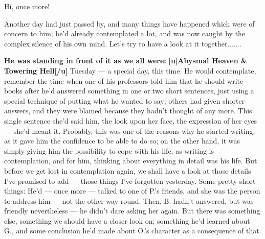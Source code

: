 Hi, once more!

Another day had just passed by, and many things have happened which were of concern to him; he'd already contemplated a lot, and was now caught by the complex silence of his own mind. Let's try to have a look at it together.......

\textbf{He was standing in front of it as we all were:}
\textbf{[u]Abysmal Heaven & Towering Hell[/u]}
Tuesday --- a special day, this time. 
He would contemplate, remember the time when one of his professors told him that he should write books after he'd answered something in one or two short sentences, just using a special technique of putting what he wanted to say; others had given shorter answers, and they were blamed because they hadn't thought of any more. This single sentence she'd said him, the look upon her face, the expression of her eyes --- she'd meant it. 
Probably, this was one of the reasons why he started writing, as it gave him the confidence to be able to do so; on the other hand, it was simply giving him the possibility to cope with his life, as writing is contemplation, and for him, thinking about everything in detail was his life. 
But before we get lost in contemplation again, we shall have a look at those details I've promised to add --- those things I've forgotten yesterday. Some pretty short things: He'd --- once more --- talked to one of P.'s friends, and she was the person to address him --- not the other way round. Then, B. hadn't answered, but was friendly nevertheless --- he didn't dare asking her again. But there was something else, something we should have a closer look on; something he'd learned about G., and some conclusion he'd made about O.'s character as a consequence of that. 
